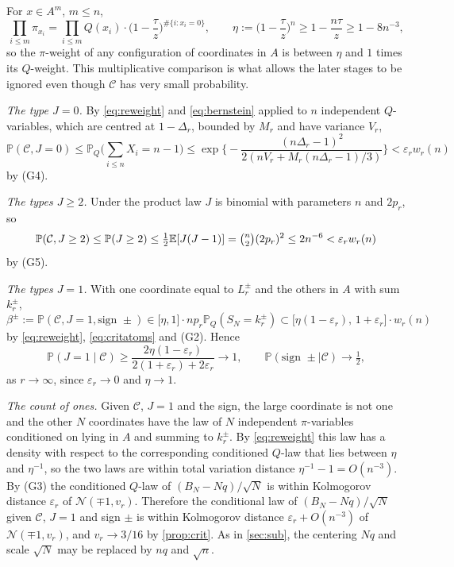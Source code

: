 \documentclass[11pt]{amsart}
\theoremstyle{definition}
\newcommand{\E}{\mathbb{E}}
\newcommand{\Prob}{\mathbb{P}}
\newcommand{\Nor}{\mathcal{N}}
\newcommand{\Cond}{\mathcal{C}}
\begin{document}
For $x\in A^m$, $m\le n$,
\begin{equation}\label{eq:reweight}
\prod_{i\le m}\pi_{x_i}=\prod_{i\le m}Q(x_i)\cdot\Big(1-\frac\tau z\Big)^{\#\{i:x_i=0\}},\qquad
\eta:=\Big(1-\frac\tau z\Big)^n\ge1-\frac{n\tau}z\ge1-8n^{-3},
\end{equation}
so the $\pi$-weight of any configuration of coordinates in $A$ is between $\eta$ and $1$ times its $Q$-weight. This multiplicative comparison is what allows the later stages to be ignored even though $\Cond$ has very small probability.

\emph{The type $J=0$.} By \eqref{eq:reweight} and \eqref{eq:bernstein} applied to $n$ independent $Q$-variables, which are centred at $1-\Delta_r$, bounded by $M_r$ and have variance $V_r$,
\[
\Prob(\Cond,J=0)\le\Prob_Q\Big(\sum_{i\le n}X_i=n-1\Big)\le\exp\Big\{-\frac{(n\Delta_r-1)^2}{2(nV_r+M_r(n\Delta_r-1)/3)}\Big\}<\varepsilon_rw_r(n)
\]
by (G4).

\emph{The types $J\ge2$.} Under the product law $J$ is binomial with parameters $n$ and $2p_r$, so
\[
\Prob(\Cond,J\ge2)\le\Prob(J\ge2)\le\tfrac12\E[J(J-1)]=\tbinom n2(2p_r)^2\le2n^{-6}<\varepsilon_rw_r(n)
\]
by (G5).

\emph{The types $J=1$.} With one coordinate equal to $L_r^\pm$ and the others in $A$ with sum $k_r^\pm$,
\[
\beta^\pm:=\Prob(\Cond,J=1,\text{sign }\pm)\in\big[\eta,1\big]\cdot np_r\Prob_Q(S_N=k_r^\pm)\subset\big[\eta(1-\varepsilon_r),\,1+\varepsilon_r\big]\cdot w_r(n)
\]
by \eqref{eq:reweight}, \eqref{eq:critatoms} and (G2). Hence
\[
\Prob(J=1\mid\Cond)\ge\frac{2\eta(1-\varepsilon_r)}{2(1+\varepsilon_r)+2\varepsilon_r}\longrightarrow1,\qquad
\Prob(\text{sign }\pm\mid\Cond)\longrightarrow\tfrac12 ,
\]
as $r\to\infty$, since $\varepsilon_r\to0$ and $\eta\to1$.

\emph{The count of ones.} Given $\Cond$, $J=1$ and the sign, the large coordinate is not one and the other $N$ coordinates have the law of $N$ independent $\pi$-variables conditioned on lying in $A$ and summing to $k_r^\pm$. By \eqref{eq:reweight} this law has a density with respect to the corresponding conditioned $Q$-law that lies between $\eta$ and $\eta^{-1}$, so the two laws are within total variation distance $\eta^{-1}-1=O(n^{-3})$. By (G3) the conditioned $Q$-law of $(B_N-Nq)/\sqrt N$ is within Kolmogorov distance $\varepsilon_r$ of $\Nor(\mp1,v_r)$. Therefore the conditional law of $(B_N-Nq)/\sqrt N$ given $\Cond$, $J=1$ and sign $\pm$ is within Kolmogorov distance $\varepsilon_r+O(n^{-3})$ of $\Nor(\mp1,v_r)$, and $v_r\to3/16$ by \cref{prop:crit}. As in \cref{sec:sub}, the centering $Nq$ and scale $\sqrt N$ may be replaced by $nq$ and $\sqrt n$.
\end{document}
